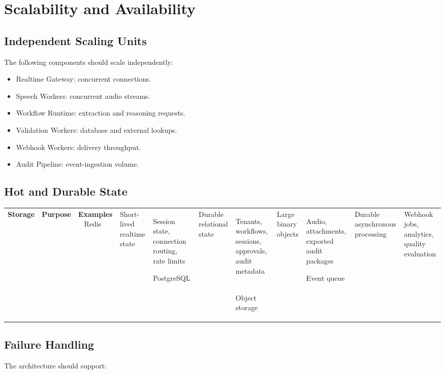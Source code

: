 \documentclass[11pt,a4paper]{article}
\begin{document}
\section{Scalability and Availability}

\subsection{Independent Scaling Units}

The following components should scale independently:

\begin{itemize}
\item Realtime Gateway: concurrent connections.
\item Speech Workers: concurrent audio streams.
\item Workflow Runtime: extraction and reasoning requests.
\item Validation Workers: database and external lookups.
\item Webhook Workers: delivery throughput.
\item Audit Pipeline: event-ingestion volume.
\end{itemize}

\subsection{Hot and Durable State}

\begin{tabularx}{\textwidth}{L{35mm}Y Y}
\toprule
\textbf{Storage} & \textbf{Purpose} & \textbf{Examples} \
\midrule
Redis
& Short-lived realtime state
& Session state, connection routing, rate limits \

PostgreSQL
& Durable relational state
& Tenants, workflows, sessions, approvals, audit metadata \

Object storage
& Large binary objects
& Audio, attachments, exported audit packages \

Event queue
& Durable asynchronous processing
& Webhook jobs, analytics, quality evaluation \
\bottomrule
\end{tabularx}

\subsection{Failure Handling}

The architecture should support:
\end{document}

